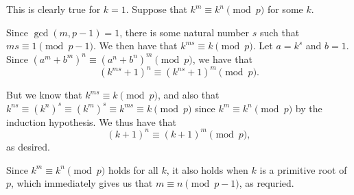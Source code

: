 \documentclass[12pt]{article}
\begin{document}
\begin{enumerate}
This is clearly true for $k = 1$. Suppose that $k^m \equiv k^n \pmod{p}$ for
some $k$.

Since $\gcd(m, p - 1) = 1$, there is some natural number $s$ such that $ms
\equiv 1 \pmod{p - 1}$. We then have that $k^{ms} \equiv k \pmod{p}$. Let $a =
k^s$ and $b = 1$. Since $(a^m + b^m)^n \equiv (a^n + b^n)^m \pmod{p}$, we have
that
\[
    (k^{ms} + 1)^n \equiv (k^{ns} + 1)^m \pmod{p}.
\]

But we know that $k^{ms} \equiv k \pmod{p}$, and also that $k^{ns} \equiv
(k^n)^s \equiv (k^m)^s \equiv k^{ms} \equiv k \pmod{p}$ since $k^m \equiv k^n
\pmod{p}$ by the induction hypothesis. We thus have that
\[
    (k + 1)^n \equiv (k + 1)^m \pmod{p},
\]
as desired.

Since $k^m \equiv k^n \pmod{p}$ holds for all $k$, it also holds when $k$ is a
primitive root of $p$, which immediately gives us that $m \equiv n \pmod{p -
1}$, as requried.


\end{enumerate}
\end{document}
